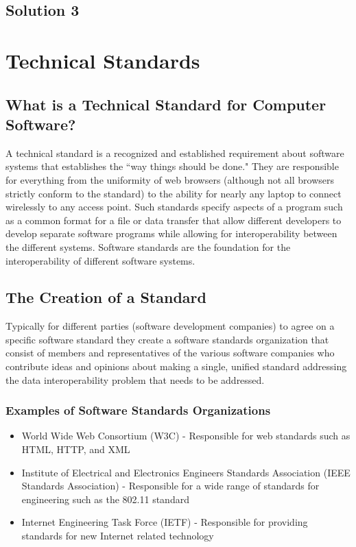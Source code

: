 \documentclass[14pt]{article}
\begin{document}
\subsection{Solution 3}

\newpage

\section{Technical Standards}

\subsection{What is a Technical Standard for Computer Software?}
A technical standard is a recognized and established requirement about software systems that establishes the ``way things should be done." They are responsible for everything from the uniformity of web browsers (although not all browsers strictly conform to the standard) to the ability for nearly any laptop to connect wirelessly to any access point. Such standards specify aspects of a program such as a common format for a file or data transfer that allow different developers to develop separate software programs while allowing for \gls{interoperability} between the different systems. Software standards are the foundation for the \gls{interoperability} of different software systems.

\subsection{The Creation of a Standard}
Typically for different parties (software development companies) to agree on a specific software standard they create a software standards organization that consist of members and representatives of the various software companies who contribute ideas and opinions about making a single, unified standard addressing the data \gls{interoperability} problem that needs to be addressed.

\subsubsection{Examples of Software Standards Organizations}

\begin{itemize}
\item World Wide Web Consortium (W3C) - Responsible for web standards such as HTML, HTTP, and XML 
\item Institute of Electrical and Electronics Engineers Standards Association (IEEE Standards Association) - Responsible for a wide range of standards for engineering such as the 802.11 standard
\item Internet Engineering Task Force (IETF) - Responsible for providing standards for new Internet related technology 
\end{itemize}
\end{document}
